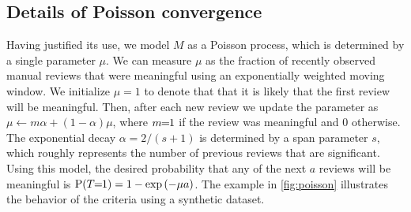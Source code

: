 \subsection{Details of Poisson convergence}

Having justified its use, we model $M$ as a Poisson process, which is determined by a single parameter $\mu$.
We can measure $\mu$ as the fraction of recently observed manual reviews that were meaningful using an
  exponentially weighted moving window.
We initialize $\mu=1$ to denote that that it is likely that the first review will be meaningful.
Then, after each new review we update the parameter as %
$\mu \leftarrow m \alpha + (1 - \alpha) \mu$, where $m\mkern-6mu=\mkern-6mu1$ if the review was meaningful and $0$ otherwise.
The exponential decay $\alpha = 2 / (s + 1)$ is determined by a span parameter $s$, which roughly represents the
  number of previous reviews that are significant.
Using this model, the desired probability that any of the next $a$ reviews will be meaningful is %
$\mathbin{\operatorname{P}}(T\mkern-6mu=\mkern-6mu1) = 1 - \textrm{exp}\left(-\mu  a\right)$.
The example in \cref{fig:poisson} illustrates the behavior of the criteria using a synthetic dataset.



\begin{comment}
Another alternative might be measuring once the advantages from the ranking
algorithm become indistinguishable from a brute force search.


Let $D = \binom{|V|}{2}$ be the number of edges in the dataset and let $N=\sum_{C \in \set{C}} (|C| - 1)$ the
  number of edges in the MSTs of all PCCs.
We can measure the density of meaninful reviews in the current labeled dataset as $N/D$.

After our estimated mu gets close enough to to $N/D$, we can terminate.

\end{comment}

\poisson{}

